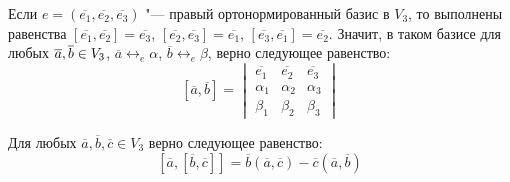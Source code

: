 \begin{note}
	Если $e = (\overline{e_1}, \overline{e_2}, \overline{e_3})$ "--- правый ортонормированный базис в $V_3$, то выполнены равенства $[\overline{e_1}, \overline{e_2}] = \overline{e_3}$, $[\overline{e_2}, \overline{e_3}] = \overline{e_1}$, $[\overline{e_3}, \overline{e_1}] = \overline{e_2}$. Значит, в таком базисе для любых $\overline{a}, \overline{b} \hm{\in} V_3$, $\overline{a} \leftrightarrow_{e} \alpha$, $\overline{b} \leftrightarrow_{e} \beta$, верно следующее равенство:
	\[[\overline{a}, \overline{b}] =
	\begin{vmatrix}
	\overline{e_1} & \overline{e_2} & \overline{e_3}\\
	\alpha_1 & \alpha_2 & \alpha_3\\
	\beta_1 & \beta_2 & \beta_3
	\end{vmatrix}\]
\end{note}

\begin{theorem}
	Для любых $\overline a, \overline b, \overline c \in V_3$ верно следующее равенство:
	\[[\overline{a}, [\overline{b}, \overline{c}]] = \overline{b}(\overline{a}, \overline{c}) - \overline{c}(\overline{a}, \overline{b})\]
\end{theorem}


